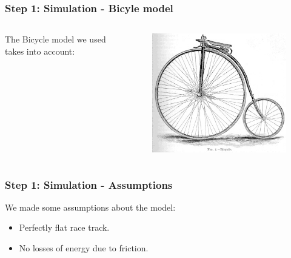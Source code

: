 \documentclass{beamer}
\begin{document}
\begin{frame}
\frametitle{Step 1: Simulation - Bicyle model}
\begin{columns}

  \begin{column}{0.6\textwidth}
  The Bicycle model we used takes into account:
  \begin{itemize}
    \vspace{0.7cm}
  \end{itemize}
  \end{column}

  \begin{column}{0.4\textwidth}
    \begin{figure}[ht!]
      \includegraphics[scale=0.3]{bicycle.jpg}
    \end{figure}
  \end{column}

\end{columns}
\end{frame}

\begin{frame}
\frametitle{Step 1: Simulation - Assumptions}
We made some assumptions about the model:
\vspace{0.7cm}
\pause
\begin{itemize}
\item Perfectly flat race track.
\pause
\vspace{0.7cm}
\item No losses of energy due to friction.
\end{itemize}
\end{frame}
\end{document}
